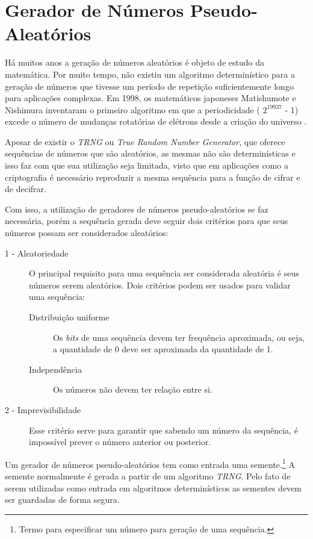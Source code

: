 \chapter{Gerador de Números Pseudo-Aleatórios}
\label{pseudo-random-number-generator}

% 
Há muitos anos a geração de números aleatórios é objeto de estudo da matemática. Por muito tempo, não existiu um algoritmo determinístico para a geração de números que tivesse um período de repetição suficientemente longo para aplicações complexas. Em 1998, os matemáticos japoneses Matishumote e Nishimura inventaram o primeiro algoritmo em que a periodicidade ( $2 ^ {19937}$ - 1) excede o número de mudanças rotatórias de elétrons desde a criação do universo \cite{cristophe-diethelm}.

%
Apesar de existir o \textit{TRNG} ou \textit{True Random Number Generator}, que oferece sequências de números que são aleatórios, as mesmas não são determinísticas e isso faz com que sua utilização seja limitada, visto que em aplicações como a criptografia é necessário reproduzir a mesma sequência para a função de cifrar e de decifrar. 

%
Com isso, a utilização de geradores de números pseudo-aleatórios se faz necessária, porém a sequência gerada deve seguir dois critérios para que seus números possam ser considerados aleatórios:

\begin{description}
	\item [1 - Aleatoriedade]
	O principal requisito para uma sequência ser considerada aleatória é seus números serem aleatórios. Dois critérios podem ser usados para validar uma sequência:
		\begin{description}
			\item [Distribuição uniforme]
			Os \textit{bits} de uma sequência devem ter frequência aproximada, ou seja, a quantidade de 0 deve ser aproximada da quantidade de 1.
			\item [Independência]
			Os números não devem ter relação entre si.
			
		\end{description}
	\item [2 - Imprevisibilidade]
	Esse critério serve para garantir que sabendo um número da sequência, é impossível prever o número anterior ou posterior.
\end{description}

Um gerador de números pseudo-aleatórios tem como entrada uma semente.\footnote{Termo para especificar um número para geração de uma sequência.} A semente normalmente é gerada a partir de um algoritmo \textit{TRNG}. Pelo fato de serem utilizadas como entrada em algoritmos determinísticos as sementes devem ser guardadas de forma segura.

